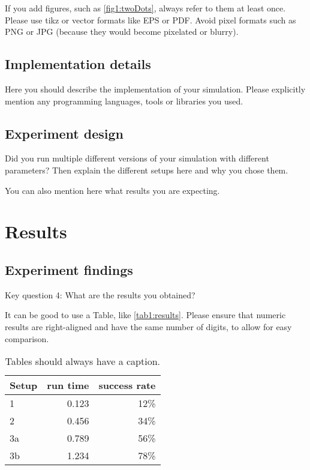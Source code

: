 \documentclass[a4paper,11pt]{article}
\begin{document}
If you add figures, such as \autoref{fig1:twoDots}, always refer to them at least once.
Please use tikz or vector formats like EPS or PDF.
Avoid pixel formats such as PNG or JPG (because they would become pixelated or blurry).

\subsection{Implementation details}

Here you should describe the implementation of your simulation.
Please explicitly mention any programming languages, tools or libraries you used.

\subsection{Experiment design}

Did you run multiple different versions of your simulation with different parameters?
Then explain the different setups here and why you chose them.

You can also mention here what results you are expecting.

\section{Results}

\subsection{Experiment findings}

Key question 4: What are the results you obtained?

It can be good to use a Table, like \autoref{tab1:results}.
Please ensure that numeric results are right-aligned and have the same number of digits, to allow for easy comparison.

\begin{table}[h]
  \centering
  \begin{tabular}{lrr}
    \toprule
    Setup & run time & success rate \\
    \midrule
    1  & 0.123 & 12\% \\
    2  & 0.456 & 34\% \\
    3a & 0.789 & 56\% \\
    3b & 1.234 & 78\% \\
    \bottomrule
  \end{tabular}
  \caption{Tables should always have a caption.}\label{tab1:results}
\end{table}
\end{document}
